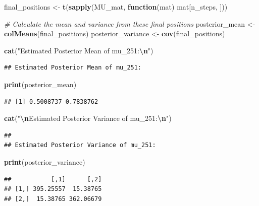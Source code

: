 \documentclass[12pt,halfline,a4paper,]{ouparticle}
\newenvironment{Shaded}{\begin{snugshade}}{\end{snugshade}}
\newcommand{\CommentTok}[1]{\textcolor[rgb]{0.56,0.35,0.01}{\textit{#1}}}
\newcommand{\ControlFlowTok}[1]{\textcolor[rgb]{0.13,0.29,0.53}{\textbf{#1}}}
\newcommand{\FunctionTok}[1]{\textcolor[rgb]{0.13,0.29,0.53}{\textbf{#1}}}
\newcommand{\NormalTok}[1]{#1}
\newcommand{\OtherTok}[1]{\textcolor[rgb]{0.56,0.35,0.01}{#1}}
\newcommand{\SpecialCharTok}[1]{\textcolor[rgb]{0.81,0.36,0.00}{\textbf{#1}}}
\newcommand{\StringTok}[1]{\textcolor[rgb]{0.31,0.60,0.02}{#1}}
\begin{document}
\begin{Shaded}
\begin{Highlighting}[]
\NormalTok{final\_positions }\OtherTok{\textless{}{-}} \FunctionTok{t}\NormalTok{(}\FunctionTok{sapply}\NormalTok{(MU\_mat, }\ControlFlowTok{function}\NormalTok{(mat) mat[n\_steps, ]))}

\CommentTok{\# Calculate the mean and variance from these final positions}
\NormalTok{posterior\_mean }\OtherTok{\textless{}{-}} \FunctionTok{colMeans}\NormalTok{(final\_positions)}
\NormalTok{posterior\_variance }\OtherTok{\textless{}{-}} \FunctionTok{cov}\NormalTok{(final\_positions)}

\FunctionTok{cat}\NormalTok{(}\StringTok{"Estimated Posterior Mean of mu\_251:}\SpecialCharTok{\textbackslash{}n}\StringTok{"}\NormalTok{)}
\end{Highlighting}
\end{Shaded}

\begin{verbatim}
## Estimated Posterior Mean of mu_251:
\end{verbatim}

\begin{Shaded}
\begin{Highlighting}[]
\FunctionTok{print}\NormalTok{(posterior\_mean)}
\end{Highlighting}
\end{Shaded}

\begin{verbatim}
## [1] 0.5008737 0.7838762
\end{verbatim}

\begin{Shaded}
\begin{Highlighting}[]
\FunctionTok{cat}\NormalTok{(}\StringTok{"}\SpecialCharTok{\textbackslash{}n}\StringTok{Estimated Posterior Variance of mu\_251:}\SpecialCharTok{\textbackslash{}n}\StringTok{"}\NormalTok{)}
\end{Highlighting}
\end{Shaded}

\begin{verbatim}
## 
## Estimated Posterior Variance of mu_251:
\end{verbatim}

\begin{Shaded}
\begin{Highlighting}[]
\FunctionTok{print}\NormalTok{(posterior\_variance)}
\end{Highlighting}
\end{Shaded}

\begin{verbatim}
##           [,1]      [,2]
## [1,] 395.25557  15.38765
## [2,]  15.38765 362.06679
\end{verbatim}
\end{document}
